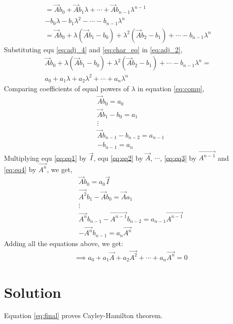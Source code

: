 \documentclass[journal,12pt,twocolumn]{IEEEtran}
\begin{document}
\begin{multline}
= \vec{A}b_0 + \vec{A}b_1\lambda +\cdots+ \vec{A}b_{n-1}\lambda^{n-1}\\
- b_0\lambda - b_1\lambda^{2}-\cdots - b_{n-1}\lambda^{n}\\
=\vec{A}b_0 + \lambda(\vec{A}b_1 - b_0) + \lambda^{2}(\vec{A}b_2 - b_1) + \cdots - b_{n-1}\lambda^{n}  \label{eq:adj_4}
\end{multline}
Substituting equ \eqref{eq:adj_4} and \eqref{eq:char_eq}  in \eqref{eq:adj_2},
\begin{multline} \label{eq:comp}
\vec{A}b_0 + \lambda(\vec{A}b_1 - b_0) + \lambda^{2}(\vec{A}b_2 - b_1) + \cdots - b_{n-1}\lambda^{n} =\\
a_0 + a_1\lambda + a_2\lambda^{2} +  \cdots+a_n\lambda^{n}
\end{multline}
Comparing coefficients of equal powers of $\lambda$ in equation \eqref{eq:comp},
\begin{align}
& \vec{A}b_0 = a_0 \label{eq:eq1}\\
& \vec{A}b_1 - b_0 = a_1 \label{eq:eq2}\\
& \vdots \\
& \vec{A}b_{n-1} - b_{n-2} = a_{n-1} \label{eq:eq3}\\
& -b_{n-1} = a_n \label{eq:eq4}
\end{align}
Multiplying equ \eqref{eq:eq1} by $\vec{I}$, equ \eqref{eq:eq2} by $\vec{A}$, $\cdots$,  \eqref{eq:eq3} by $\vec{A^{n-1}}$ and  \eqref{eq:eq4} by $\vec{A^{n}}$, we get,
\begin{align}
& \vec{A}b_0 = a_0\vec{I} \label{eq:eq5}\\
& \vec{A^{2}}b_1 - \vec{A}b_0 = \vec{A}a_1 \label{eq:eq6}\\
& \vdots \\
& \vec{A^{n}}b_{n-1} - \vec{A^{n-1}}b_{n-2} = a_{n-1}\vec{A^{n-1}} \label{eq:eq7}\\
& -\vec{A^{n}}b_{n-1} = a_n\vec{A^{n}} \label{eq:eq8}
\end{align}
Adding all the equations above, we get:
\begin{align}
&\implies \boxed{a_0 + a_1\vec{A} + a_2\vec{A^{2}} +  \cdots+a_n\vec{A^{n}} = 0} \label{eq:final}
\end{align}
\section{Solution}

Equation \eqref{eq:final} proves Cayley-Hamilton theorem.
\\
\end{document}
